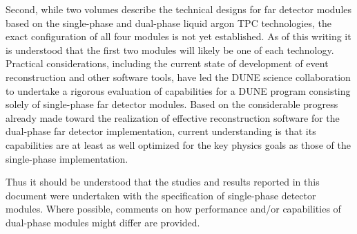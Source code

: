 Second, while two volumes describe the technical designs
for far detector modules based on the single-phase and
dual-phase liquid argon TPC technologies, the exact
configuration of all four modules is not yet established.  As of this writing
it is understood that the first two modules will likely
be one of each technology.  Practical considerations,
including the current state of development of event
reconstruction and other software tools, have
led the DUNE science collaboration to undertake a rigorous
evaluation of capabilities for a DUNE program consisting
solely of single-phase far detector modules.  Based
on the considerable progress already made toward the
realization of effective reconstruction software for the
dual-phase far detector implementation, current
understanding is that its capabilities are at least
as well optimized for the key physics goals as those of
the single-phase implementation.

Thus it should be understood that the studies and results
reported in this document were undertaken with the
specification of single-phase detector modules.  Where possible,
comments on how performance and/or capabilities of
dual-phase modules might differ are provided.





